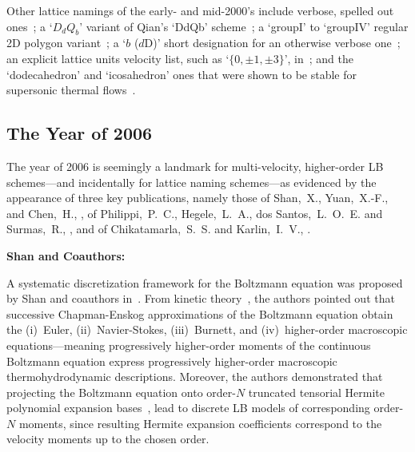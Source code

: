     Other     lattice     namings     of     the     early-     and     mid-2000's     include     verbose,     spelled      out
    ones~\cite{2001-dHumieresD+LallemandP-PhysRevE,   2005-LuXY-IntJModPhysC};   a   `$D_dQ_b$'   variant   of   Qian's   `DdQb'
    scheme~\cite{2003-NourgalievRR+JosephD-IntJMulFlow};     a     `groupI'     to     `groupIV'     regular     2D      polygon
    variant~\cite{2003-WatariM+TsutaharaM-PhysRevE, 2007-WatariM-PhysA}; a `$b$  ($d$D)'  short  designation  for  an  otherwise
    verbose one~\cite{2006-ChikatamarlaSS+KarlinIV-PhysRevLett}; an explicit lattice units velocity list, such as `$\{0, \pm  1,
    \pm 3\}$', in~\cite{2006-ChikatamarlaSS+KarlinIV-PhysRevLett}; and the `dodecahedron' and `icosahedron' ones that were shown
    to be stable for supersonic thermal flows~\cite{2006-WatariM+TsutaharaM-PhysA, 2007-WatariM-PhysA}.

    \subsection{The Year of 2006}

    The year of 2006 is seemingly a landmark for multi-velocity, higher-order LB schemes---and  incidentally  for  lattice  naming
    schemes---as evidenced by the appearance of three key publications, namely those of  Shan,~X.,  Yuan,~X.-F.,  and  Chen,~H.,
    \cite{2006-ShanX+ChenH-JFluidMech},   of   Philippi,~P.~C.,   Hegele,~L.~A.,   dos    Santos,~L.~O.~E.    and    Surmas,~R.,
    \cite{2006-PhilippiPC+SurmasR-PhysRevE},        and        of         Chikatamarla,~S.~S.         and         Karlin,~I.~V.,
    \cite{2006-ChikatamarlaSS+KarlinIV-PhysRevLett}.


    \vspace{2.0mm}\noindent\textbf{Shan and Coauthors:}\vspace{1.0mm}

    A  systematic   discretization   framework   for   the   Boltzmann   equation   was   proposed   by   Shan   and   coauthors
    in~\cite{2006-ShanX+ChenH-JFluidMech}.  From  kinetic  theory~\cite{2011-HarrisS-Dover,   2003-LiboffRL-bookSpringer},   the
    authors pointed out  that  successive  Chapman-Enskog  approximations  of  the  Boltzmann  equation  obtain  the  (i)~Euler,
    (ii)~Navier-Stokes, (iii)~Burnett, and (iv)~high\-er-or\-der macroscopic equations---meaning progressively  high\-er-or\-der
    moments  of  the  continuous  Boltzmann  equation  express  progressively  high\-er-or\-der  macroscopic  thermohydrodynamic
    descriptions. Moreover, the authors demonstrated that projecting the Boltzmann equation onto order-$N$  truncated  tensorial
    Hermite polynomial expansion bases~\cite{1949-GradH-CommPureApplMath}, lead  to  discrete  LB  models  of  corres\-pon\-ding
    order-$N$ moments, since resulting Hermite expansion coefficients correspond to the velocity moments up to the chosen order.

